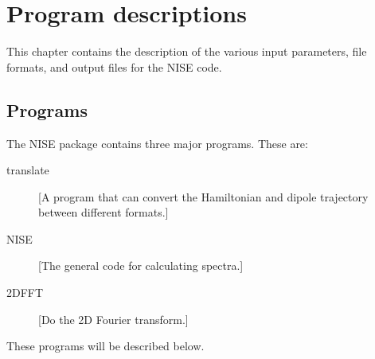 \chapter{Program descriptions}
This chapter contains the description of the various input parameters, file formats, and output files for the NISE code.

\section{Programs}
The NISE package contains three major programs. These are:
\begin{description}
\item [translate] [A program that can convert the Hamiltonian and dipole trajectory between different formats.]
\item [NISE] [The general code for calculating spectra.]
\item [2DFFT] [Do the 2D Fourier transform.]
\end{description}
These programs will be described below. 

